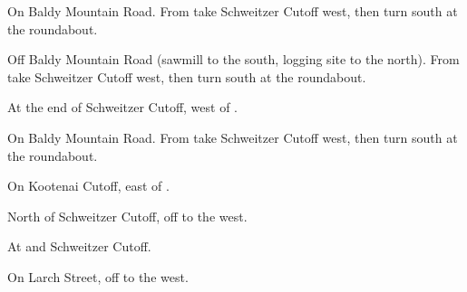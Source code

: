 
\begin{LocationList}

On Baldy Mountain Road.
From   take Schweitzer Cutoff west, then turn south at the roundabout.

Off Baldy Mountain Road (sawmill to the south, logging site to the north).
From   take Schweitzer Cutoff west, then turn south at the roundabout.

At the end of Schweitzer Cutoff, west of  .

On Baldy Mountain Road.
From   take Schweitzer Cutoff west, then turn south at the roundabout.

On Kootenai Cutoff, east of  .

North of Schweitzer Cutoff, off   to the west.

\Location{\TruckStop \Gas \Rest}
At   and Schweitzer Cutoff.

On Larch Street, off  to the west.

\end{LocationList}
